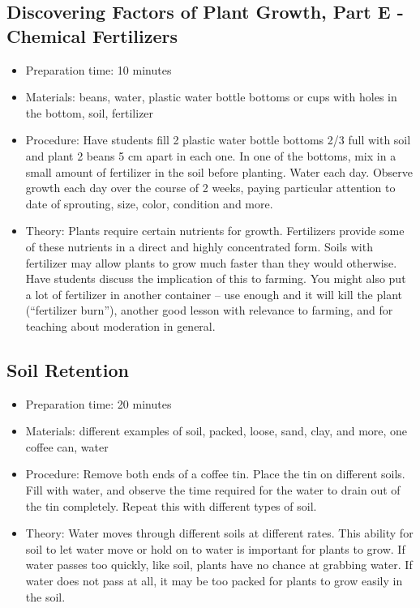 \subsection{Discovering Factors of Plant Growth, Part E - Chemical Fertilizers}
\begin{itemize}
\item{Preparation time: 10 minutes}
\item{Materials: beans, water, plastic water bottle bottoms or cups with holes in the bottom, soil, fertilizer}
\item{Procedure: Have students fill 2 plastic water bottle bottoms 2/3 full with soil and plant 2 beans 5 cm apart in each one. In one of the bottoms, mix in a small amount of fertilizer in the soil before planting. Water each day. Observe growth each day over the course of 2 weeks, paying particular attention to date of sprouting, size, color, condition and more.}
\item{Theory: Plants require certain nutrients for growth. Fertilizers provide some of these nutrients in a direct and highly concentrated form. Soils with fertilizer may allow plants to grow much faster than they would otherwise. Have students discuss the implication of this to farming. You might also put a lot of fertilizer in another container – use enough and it will kill the plant (“fertilizer burn”), another good lesson with relevance to farming, and for teaching about moderation in general.}
\end{itemize}

\subsection{Soil Retention}
\begin{itemize}
\item{Preparation time: 20 minutes}
\item{Materials: different examples of soil, packed, loose, sand, clay, and more, one coffee can, water}
\item{Procedure: Remove both ends of a coffee tin. Place the tin on different soils. Fill with water, and observe the time required for the water to drain out of the tin completely. Repeat this with different types of soil.}
\item{Theory: Water moves through different soils at different rates. This ability for soil to let water move or hold on to water is important for plants to grow. If water passes too quickly, like soil, plants have no chance at grabbing water. If water does not pass at all, it may be too packed for plants to grow easily in the soil.}
\end{itemize}

